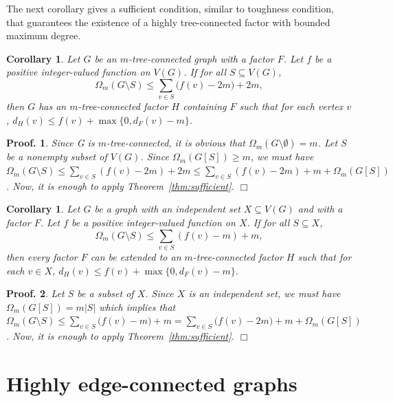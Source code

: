 \documentclass[10pt,bezier]{article}
\newtheorem{precor}[prethm]{{\bf Corollary}}
\newenvironment{cor}{\begin{precor}{\hspace{-0.5
em}{\bf.}}}{\end{precor}}
\newtheorem{preproof}{{\bf Proof.}}
\newenvironment{proof}[1]{\begin{preproof}{\rm
#1}\hfill{$\Box$}}{\end{preproof}}
\begin{document}
The next corollary gives a sufficient condition, similar to toughness condition, that guarantees
the existence of a highly tree-connected factor with bounded maximum degree. 
\begin{cor}\label{cor:similar:toughness}
Let $G$ be an $m$-tree-connected graph with a factor $F$. 
Let $f$ be a positive integer-valued function on $V(G)$.
If for all $S\subseteq V(G)$,
$$\Omega_m(G\setminus S)\le \sum_{v\in S}\big(f(v)-2m\big)+2m,$$
then $G$ has an $m$-tree-connected factor $H$ containing $F$ such that for each vertex $v$,
 $d_H(v)\le f(v)+\max\{0,d_F(v)-m\}$.
\end{cor}
\begin{proof}
{Since G is $m$-tree-connected, it is obvious that $\Omega_m(G\setminus \emptyset) = m$.
Let $S$ be a nonempty subset of $V(G)$. Since $\Omega_m(G[S])\ge m $,
we must have $\Omega_m(G\setminus S)\le \sum_{v\in S}(f(v)-2m)+2m\le \sum_{v\in S}(f(v)-2m)+m+\Omega_m(G[ S])$.
Now, it is enough to apply Theorem~\ref{thm:sufficient}.
}\end{proof}
\begin{cor}\label{cor:X-independent}
{Let $G$ be a graph with an independent set $X\subseteq V(G)$ and with a factor $F$.
Let $f$ be a positive integer-valued function on $X$.
 If for all $S\subseteq X$, 
$$\Omega_m(G\setminus S)\le \sum_{v\in S}(f(v)-m)+m,$$ 
then every factor $F$ can be extended to an $m$-tree-connected factor $H$ such that for each $v\in X$,
$d_H(v)\le f(v)+\max\{0, d_F(v)-m\}.$
}\end{cor}
%
\begin{proof}
{Let $S$ be a subset of $X$. Since $X$ is an independent set, we must have $\Omega_m(G[S])=m|S|$ which implies that
$\Omega_m(G\setminus S)\le \sum_{v\in S}\big(f(v)-m\big)+m= \sum_{v\in S}\big(f(v)-2m\big)+m+\Omega_m(G[S])$.
Now, it is enough to apply Theorem~\ref{thm:sufficient}.
}\end{proof}
%
%
%
%
%
%
%
\section{Highly edge-connected graphs}
\label{sec:edge-connected-graphs}
\end{document}
